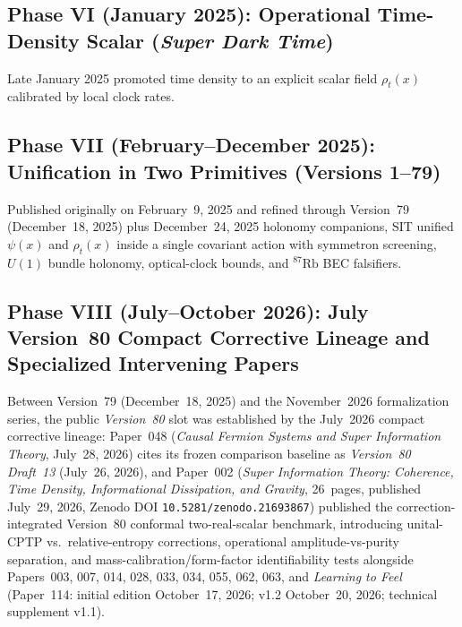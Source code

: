 \subsection{Phase VI (January 2025): Operational Time-Density Scalar (\emph{Super Dark Time})}
Late January 2025 promoted time density to an explicit scalar field $\rho_t(x)$ calibrated by local clock rates.

\subsection{Phase VII (February--December 2025): Unification in Two Primitives (Versions 1--79)}
Published originally on February~9, 2025 and refined through Version~79 (December~18, 2025) plus December~24, 2025 holonomy companions, SIT unified $\psi(x)$ and $\rho_t(x)$ inside a single covariant action with symmetron screening, $U(1)$ bundle holonomy, optical-clock bounds, and $^{87}\mathrm{Rb}$ BEC falsifiers.

\subsection{Phase VIII (July--October 2026): July Version~80 Compact Corrective Lineage and Specialized Intervening Papers}
Between Version~79 (December~18, 2025) and the November~2026 formalization series, the public \emph{Version~80} slot was established by the July~2026 compact corrective lineage: Paper~048 (\emph{Causal Fermion Systems and Super Information Theory}, July~28, 2026) cites its frozen comparison baseline as \emph{Version~80 Draft~13} (July~26, 2026), and Paper~002 (\emph{Super Information Theory: Coherence, Time Density, Informational Dissipation, and Gravity}, 26~pages, published July~29, 2026, Zenodo DOI \texttt{10.5281/zenodo.21693867}) published the correction-integrated Version~80 conformal two-real-scalar benchmark, introducing unital-CPTP vs.\ relative-entropy corrections, operational amplitude-vs-purity separation, and mass-calibration/form-factor identifiability tests alongside Papers~003, 007, 014, 028, 033, 034, 055, 062, 063, and \emph{Learning to Feel} (Paper~114: initial edition October~17, 2026; v1.2 October~20, 2026; technical supplement v1.1).

